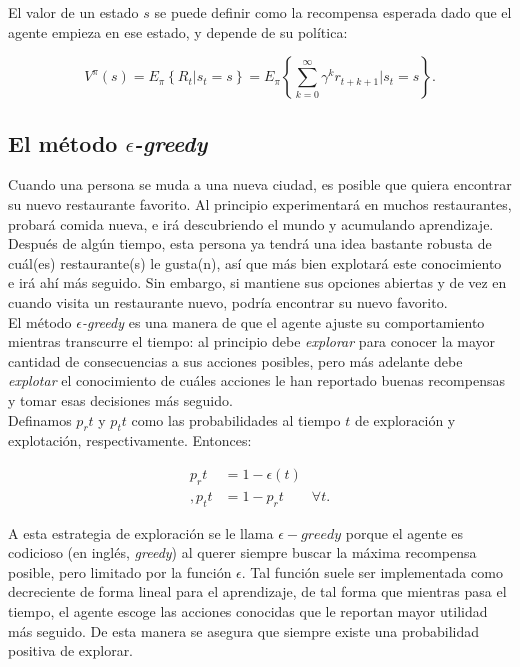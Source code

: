 El valor de un estado $s$ se puede definir como la recompensa esperada dado que el agente empieza en ese estado, y depende de su pol\'itica:

$$
V^{\pi}(s) = E_{\pi}\left\{R_{t}|s_{t} = s\right\} = E_{\pi}\left\{\sum_{k=0}^{\infty}\gamma^{k}r_{t+k+1}|s_{t}=s\right\}.
$$

\subsection{El m\'etodo $\epsilon$\textit{-greedy}}

Cuando una persona se muda a una nueva ciudad, es posible que quiera encontrar su nuevo restaurante favorito. Al principio experimentar\'a en muchos restaurantes, probar\'a comida nueva, e ir\'a descubriendo el mundo y acumulando aprendizaje. Despu\'es de alg\'un tiempo, esta persona ya tendr\'a una idea bastante robusta de cu\'al(es) restaurante(s) le gusta(n), as\'i que m\'as bien explotar\'a este conocimiento e ir\'a ah\'i m\'as seguido. Sin embargo, si mantiene sus opciones abiertas y de vez en cuando visita un restaurante nuevo, podr\'ia encontrar su nuevo favorito.\\

El m\'etodo $\epsilon$\textit{-greedy} es una manera de  que el agente ajuste su comportamiento mientras transcurre el tiempo: al principio debe \textit{explorar} para conocer la mayor cantidad de consecuencias a sus acciones posibles, pero m\'as adelante debe \textit{explotar} el conocimiento de cu\'ales acciones le han reportado buenas recompensas y tomar esas decisiones m\'as seguido. \\

Definamos $p_r{t}$ y $p_t{t}$ como las probabilidades al tiempo $t$ de exploraci\'on y explotaci\'on, respectivamente. Entonces:

\vspace{-30pt}
\begin{align*}
p_r{t} &= 1 - \epsilon(t) \\,
p_t{t} &= 1 - p_r{t} \quad \quad \forall t.
\end{align*}

A esta estrategia de exploraci\'on se le llama $\epsilon-greedy$ porque el agente es codicioso (en ingl\'es, \textit{greedy}) al querer siempre buscar la m\'axima recompensa posible, pero limitado por la funci\'on $\epsilon$. Tal funci\'on suele ser implementada como decreciente de forma lineal para el aprendizaje, de tal forma que mientras pasa el tiempo, el agente escoge las acciones conocidas que le reportan mayor utilidad m\'as seguido. De esta manera se asegura que siempre existe una probabilidad positiva de explorar.\\

